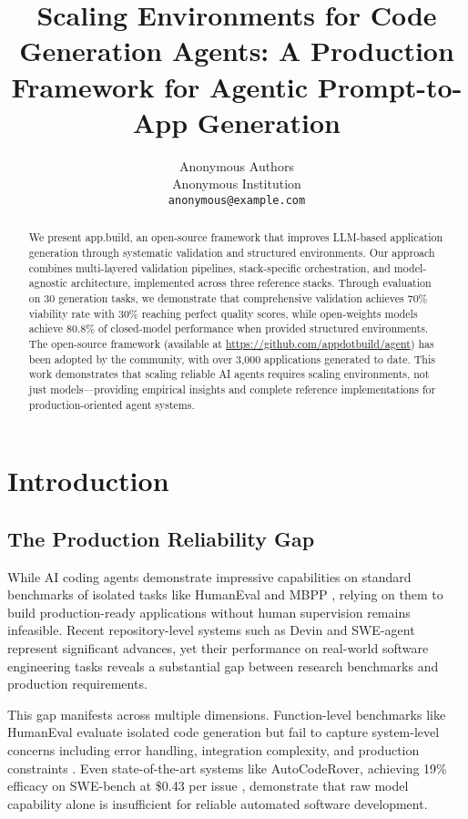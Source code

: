 \documentclass{article}
\title{Scaling Environments for Code Generation Agents: A Production Framework for Agentic Prompt-to-App Generation}
\author{%
  Anonymous Authors \\
  Anonymous Institution \\
  \texttt{anonymous@example.com} \\
}
\begin{document}
\maketitle

\begin{abstract}
We present app.build, an open-source framework that improves LLM-based application generation through systematic validation and structured environments. Our approach combines multi-layered validation pipelines, stack-specific orchestration, and model-agnostic architecture, implemented across three reference stacks. Through evaluation on 30 generation tasks, we demonstrate that comprehensive validation achieves 70\% viability rate with 30\% reaching perfect quality scores, while open-weights models achieve 80.8\% of closed-model performance when provided structured environments. The open-source framework (available at \url{https://github.com/appdotbuild/agent}) has been adopted by the community, with over 3,000 applications generated to date. This work demonstrates that scaling reliable AI agents requires scaling environments, not just models---providing empirical insights and complete reference implementations for production-oriented agent systems.
\end{abstract}

\section{Introduction}
\label{sec:intro}

\subsection{The Production Reliability Gap}

While AI coding agents demonstrate impressive capabilities on standard benchmarks of isolated tasks like HumanEval \citep{chen2021evaluating} and MBPP \citep{austin2021program}, relying on them to build production-ready applications without human supervision remains infeasible. Recent repository-level systems such as Devin \citep{cognition2024swe} and SWE-agent \citep{yang2024swe} represent significant advances, yet their performance on real-world software engineering tasks reveals a substantial gap between research benchmarks and production requirements.

This gap manifests across multiple dimensions. Function-level benchmarks like HumanEval evaluate isolated code generation but fail to capture system-level concerns including error handling, integration complexity, and production constraints \citep{liu2023your}. Even state-of-the-art systems like AutoCodeRover, achieving 19\% efficacy on SWE-bench at \$0.43 per issue \citep{zhang2024autocoder}, demonstrate that raw model capability alone is insufficient for reliable automated software development.
\end{document}
